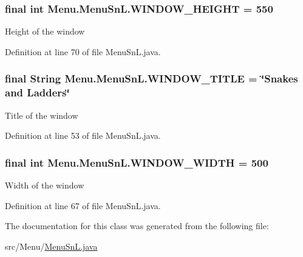 \subsubsection[{W\+I\+N\+D\+O\+W\+\_\+\+H\+E\+I\+G\+H\+T}]{\setlength{\rightskip}{0pt plus 5cm}final int Menu.\+Menu\+Sn\+L.\+W\+I\+N\+D\+O\+W\+\_\+\+H\+E\+I\+G\+H\+T = 550\hspace{0.3cm}{\ttfamily [private]}}\label{class_menu_1_1_menu_sn_l_a32c2e05c64b453df29d8b6df1061a939}
Height of the window 

Definition at line 70 of file Menu\+Sn\+L.\+java.

\hypertarget{class_menu_1_1_menu_sn_l_a62bbb19bbedcdf63b575b4ae1048c343}{}
\subsubsection[{W\+I\+N\+D\+O\+W\+\_\+\+T\+I\+T\+L\+E}]{\setlength{\rightskip}{0pt plus 5cm}final String Menu.\+Menu\+Sn\+L.\+W\+I\+N\+D\+O\+W\+\_\+\+T\+I\+T\+L\+E = \char`\"{}Snakes and Ladders\char`\"{}\hspace{0.3cm}{\ttfamily [private]}}\label{class_menu_1_1_menu_sn_l_a62bbb19bbedcdf63b575b4ae1048c343}
Title of the window 

Definition at line 53 of file Menu\+Sn\+L.\+java.

\hypertarget{class_menu_1_1_menu_sn_l_a2fcacd6fe04ce3a540d0d100ca57b993}{}
\subsubsection[{W\+I\+N\+D\+O\+W\+\_\+\+W\+I\+D\+T\+H}]{\setlength{\rightskip}{0pt plus 5cm}final int Menu.\+Menu\+Sn\+L.\+W\+I\+N\+D\+O\+W\+\_\+\+W\+I\+D\+T\+H = 500\hspace{0.3cm}{\ttfamily [private]}}\label{class_menu_1_1_menu_sn_l_a2fcacd6fe04ce3a540d0d100ca57b993}
Width of the window 

Definition at line 67 of file Menu\+Sn\+L.\+java.



The documentation for this class was generated from the following file\+:\begin{DoxyCompactItemize}
\item 
src/\+Menu/\hyperlink{_menu_sn_l_8java}{Menu\+Sn\+L.\+java}\end{DoxyCompactItemize}
